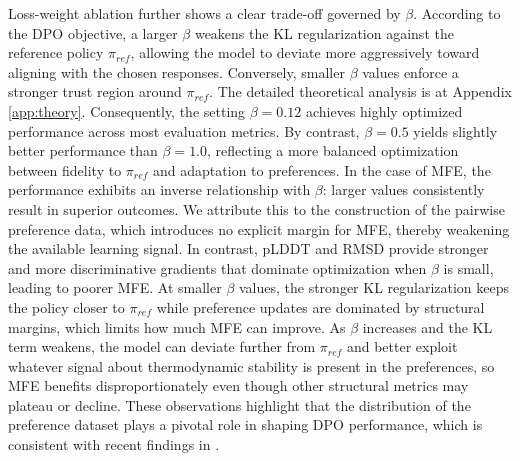 Loss-weight ablation further shows a clear trade-off governed by $\beta$. 
{
According to the DPO objective, 
a larger $\beta$ weakens the KL regularization against the reference policy $\pi_{ref}$, allowing the model to deviate more aggressively toward aligning with the chosen responses. Conversely, smaller $\beta$ values enforce a stronger trust region around $\pi_{ref}$. The detailed theoretical analysis is at Appendix \ref{app:theory}.
}
Consequently, the setting $\beta=0.12$ achieves highly optimized performance across most evaluation metrics. By contrast, $\beta=0.5$ yields slightly better performance than $\beta=1.0$, reflecting a more balanced optimization between fidelity to $\pi_{ref}$ and adaptation to preferences. In the case of MFE, the performance exhibits an inverse relationship with $\beta$: larger values consistently result in superior outcomes. We attribute this to the construction of the pairwise preference data, which introduces no explicit margin for MFE, thereby weakening the available learning signal. In contrast, pLDDT and RMSD provide stronger and more discriminative gradients that dominate optimization when $\beta$ is small, leading to poorer MFE. At smaller $\beta$ values, the stronger KL regularization keeps the policy closer to $\pi_{ref}$ while preference updates are dominated by structural margins, which limits how much MFE can improve. As $\beta$ increases and the KL term weakens, the model can deviate further from $\pi_{ref}$ and better exploit whatever signal about thermodynamic stability is present in the preferences, so MFE benefits disproportionately even though other structural metrics may plateau or decline. These observations highlight that the distribution of the preference dataset plays a pivotal role in shaping DPO performance, which is consistent with recent findings in \citep{Pan2025WhatMI}.




